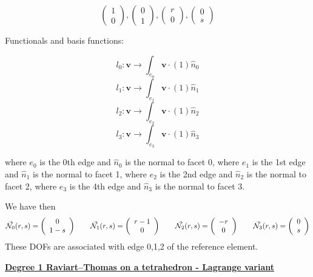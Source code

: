 \[
\left( \begin{array}{c} 1 \\ 0  \end{array} \right),
\left( \begin{array}{c} 0 \\ 1  \end{array} \right),
\left( \begin{array}{c} r \\ 0  \end{array} \right),
\left( \begin{array}{c} 0 \\ s  \end{array} \right)
\]

Functionals and basis functions:

\[
l_0: {\bm v} \rightarrow \int_{e_0} {\bm v} \cdot (1) \hat{n}_0
\]
\[
l_1: {\bm v} \rightarrow \int_{e_1} {\bm v} \cdot (1) \hat{n}_1
\]
\[
l_2: {\bm v} \rightarrow \int_{e_2} {\bm v} \cdot (1) \hat{n}_2
\]
\[
l_3: {\bm v} \rightarrow \int_{e_3} {\bm v} \cdot (1) \hat{n}_3
\]


where $e_0$ is the 0th edge and $\hat{n}_0$ is the normal to facet 0,
where $e_1$ is the 1st edge and $\hat{n}_1$ is the normal to facet 1,
where $e_2$ is the 2nd edge and $\hat{n}_2$ is the normal to facet 2,
where $e_3$ is the 4th edge and $\hat{n}_3$ is the normal to facet 3.


We have then
\[
\vec{{\mathcal{N}}}_0(r,s) = \left( \begin{array}{c} 0 \\ 1-s  \end{array} \right)
\qquad
\vec{{\mathcal{N}}}_1(r,s) = \left( \begin{array}{c} r-1 \\0  \end{array} \right)
\qquad
\vec{{\mathcal{N}}}_2(r,s) = \left( \begin{array}{c} -r \\ 0  \end{array} \right)
\qquad
\vec{{\mathcal{N}}}_3(r,s) = \left( \begin{array}{c} 0 \\s  \end{array} \right)
\]
These DOFs are associated with edge 0,1,2 of the reference element.


\vspace{.5cm}
\noindent
\underline{\bf Degree 1 Raviart–Thomas on a tetrahedron - Lagrange variant}


